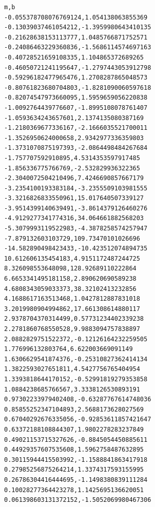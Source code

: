 \begin{figure}[!hp]
\centering
{}\label{tab:49-coefficients}
\small
\begin{verbatim}
m,b
-0.055378708076769124,1.054138063855369
-0.13039037461054212,-1.3959980643410135
-0.21628638153113777,1.0485766871752571
-0.24086463229360836,-1.5686114574697163
-0.40728521659108335,1.104865372689265
-0.46050721241195647,-1.2797443053912798
-0.59296182477965476,1.2708287865048573
-0.80761823680704803,-1.8281090060597618
-0.82074547973660095,1.5959659056220838
-1.0092764439776607,-1.8995108078761407
-1.0593634243657601,2.1374135080387169
-1.2180369677336167,-2.1666035521700011
-1.3526950624000658,2.9342977336359803
-1.3731070875197393,-2.0864498484267684
-1.757707592910895,4.5314353597917485
-1.856336775766769,-2.532829936322365
-2.3040072504210496,7.4246690857667179
-3.2354100193383184,-3.2355509103981555
-3.3216826833550961,15.017640507339127
-3.9514399140639491,-3.8614379126460276
-4.9129277341774316,34.064661882568203
-5.3079993119522983,-4.3878258574257947
-7.879132603103729,109.73470101026696
-14.582890498423433,-10.423512074894735
10.612606135454183,4.9151172487244725
8.326098553648098,128.92689110222864
6.6653341495181158,2.890620690589238
4.6808343059033373,38.32102413232856
4.1688617163513468,1.0427812887831018
3.2019980904994862,17.661308614880117
2.9378704370314499,0.57731234402339238
2.2781860768550528,9.9883094757838897
2.0882829751522372,-0.12126164232259505
1.776996132803764,6.622003669091149
1.6306629541874376,-0.25310827362414134
1.3822593027651811,4.5427756765404954
1.3393818644170152,-0.52991819279353858
1.0884238685766567,3.3338126530893191
0.97302233979402408,-0.63287767614748036
0.85855252347104893,2.5688173628027569
0.67040292676335056,-0.92853611857421647
0.63372188108844307,1.9802278283237849
0.49021153715327626,-0.8845054450885611
0.44929357607535608,1.5962758487632895
0.30115944415503992,-1.1588841863417918
0.27985256875264214,1.3374317593155995
0.26786304416444695,-1.1498380839111284
0.10028277364423278,1.1425695136620051
0.061398603131372152,-1.5052069980467306
\end{verbatim}
\end{figure}
